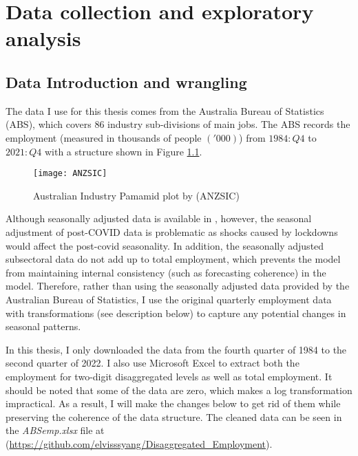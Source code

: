 \documentclass{monashthesis}
\begin{document}
\clearpage

\hypertarget{data-collection-and-exploratory-analysis}{%
\chapter{Data collection and exploratory analysis}\label{data-collection-and-exploratory-analysis}}

\hypertarget{data-introduction-and-wrangling}{%
\section{Data Introduction and wrangling}\label{data-introduction-and-wrangling}}

The data I use for this thesis comes from the Australia Bureau of Statistics (ABS), which covers 86 industry sub-divisions of main jobs. The ABS records the employment (measured in thousands of people \(('000)\)) from \(1984:Q4\) to \(2021:Q4\) with a structure shown in Figure \ref{fig:anzsic}.

\graphicspath{ {/Users/elvisyang/Desktop/hon_proj/Disaggregated_Employment/Honours_thesis/figures} }

\begin{figure}[H]
\texttt{[image: ANZSIC]}
\centering
\caption{Australian Industry Pamamid plot by (ANZSIC)}
\label{fig:anzsic}
\end{figure}

Although seasonally adjusted data is available in \autocite{ABS2022}, however, the seasonal adjustment of post-COVID data is problematic as shocks caused by lockdowns would affect the post-covid seasonality. In addition, the seasonally adjusted subsectoral data do not add up to total employment, which prevents the model from maintaining internal consistency (such as forecasting coherence) in the model. Therefore, rather than using the seasonally adjusted data provided by the Australian Bureau of Statistics, I use the original quarterly employment data with transformations (see description below) to capture any potential changes in seasonal patterns.

In this thesis, I only downloaded the data from the fourth quarter of 1984 to the second quarter of 2022. I also use Microsoft Excel to extract both the employment for two-digit disaggregated levels as well as total employment. It should be noted that some of the data are zero, which makes a log transformation impractical. As a result, I will make the changes below to get rid of them while preserving the coherence of the data structure. The cleaned data can be seen in the \emph{ABSemp.xlsx} file at (\url{https://github.com/elvisssyang/Disaggregated_Employment}).
\end{document}
